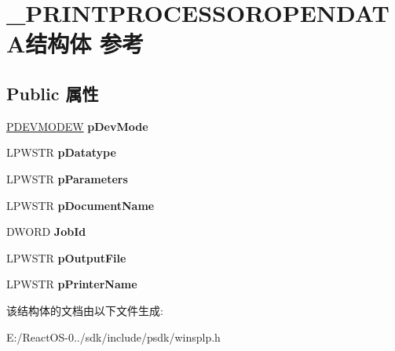 \hypertarget{struct___p_r_i_n_t_p_r_o_c_e_s_s_o_r_o_p_e_n_d_a_t_a}{}\section{\+\_\+\+P\+R\+I\+N\+T\+P\+R\+O\+C\+E\+S\+S\+O\+R\+O\+P\+E\+N\+D\+A\+T\+A结构体 参考}
\label{struct___p_r_i_n_t_p_r_o_c_e_s_s_o_r_o_p_e_n_d_a_t_a}
\subsection*{Public 属性}
\begin{DoxyCompactItemize}
\item 
\mbox{\label{struct___p_r_i_n_t_p_r_o_c_e_s_s_o_r_o_p_e_n_d_a_t_a_ac54c1e1f5c914e40cada6bb43a4422a1}} 
\hyperlink{struct__devicemode_w}{P\+D\+E\+V\+M\+O\+D\+EW} {\bfseries p\+Dev\+Mode}
\item 
\mbox{\label{struct___p_r_i_n_t_p_r_o_c_e_s_s_o_r_o_p_e_n_d_a_t_a_a192b34ee64fcaa5b296ab24213094af6}} 
L\+P\+W\+S\+TR {\bfseries p\+Datatype}
\item 
\mbox{\label{struct___p_r_i_n_t_p_r_o_c_e_s_s_o_r_o_p_e_n_d_a_t_a_a426d21ce72298c3078dd35636aa851c8}} 
L\+P\+W\+S\+TR {\bfseries p\+Parameters}
\item 
\mbox{\label{struct___p_r_i_n_t_p_r_o_c_e_s_s_o_r_o_p_e_n_d_a_t_a_ae3e2b1e2aa162c9f2ce0b76f80647c36}} 
L\+P\+W\+S\+TR {\bfseries p\+Document\+Name}
\item 
\mbox{\label{struct___p_r_i_n_t_p_r_o_c_e_s_s_o_r_o_p_e_n_d_a_t_a_a4de5f424fe172a02f03af050136d7d03}} 
D\+W\+O\+RD {\bfseries Job\+Id}
\item 
\mbox{\label{struct___p_r_i_n_t_p_r_o_c_e_s_s_o_r_o_p_e_n_d_a_t_a_a69720e03fd316e3fb3ce29c968ce3bb8}} 
L\+P\+W\+S\+TR {\bfseries p\+Output\+File}
\item 
\mbox{\label{struct___p_r_i_n_t_p_r_o_c_e_s_s_o_r_o_p_e_n_d_a_t_a_a66eddaa4271374e6df6358ce95db21df}} 
L\+P\+W\+S\+TR {\bfseries p\+Printer\+Name}
\end{DoxyCompactItemize}


该结构体的文档由以下文件生成\+:\begin{DoxyCompactItemize}
\item 
E\+:/\+React\+O\+S-\/0../sdk/include/psdk/winsplp.\+h\end{DoxyCompactItemize}
